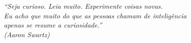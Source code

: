 \begin{epigrafe}
    \vspace*{\fill}
	\begin{flushright}
		\textit{``Seja curioso. Leia muito. Experimente coisas novas.\\ Eu acho que muito do que as pessoas chamam de inteligência\\apenas se resume a curiosidade.''\\
		          (Aaron Swartz)}
	\end{flushright}
\end{epigrafe}

